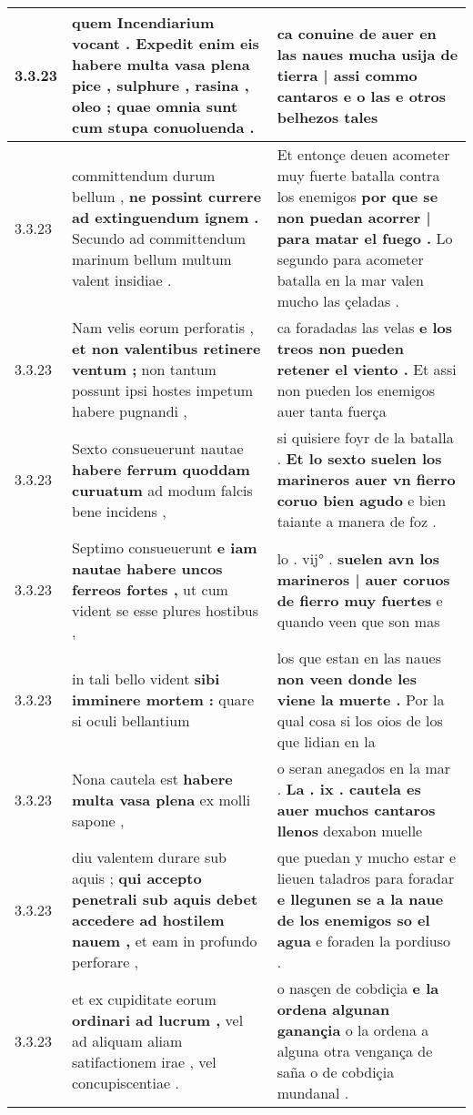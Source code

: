 \begin{tabular}{|p{1cm}|p{6.5cm}|p{6.5cm}|}
3.3.23 & quem Incendiarium vocant . \textbf{ Expedit enim eis habere multa vasa plena pice , sulphure , rasina , oleo ; } quae omnia sunt cum stupa conuoluenda . & ca conuine de auer en las naues \textbf{ mucha usija de tierra | assi commo cantaros e o las } e otros belhezos tales \\\hline
3.3.23 & committendum durum bellum , \textbf{ ne possint currere ad extinguendum ignem . } Secundo ad committendum marinum bellum multum valent insidiae . & Et entonçe deuen acometer muy fuerte batalla contra los enemigos \textbf{ por que se non puedan acorrer | para matar el fuego . } Lo segundo para acometer batalla en la mar valen mucho las çeladas . \\\hline
3.3.23 & Nam velis eorum perforatis , \textbf{ et non valentibus retinere ventum ; } non tantum possunt ipsi hostes impetum habere pugnandi , & ca foradadas las velas \textbf{ e los treos non pueden retener el viento . } Et assi non pueden los enemigos auer tanta fuerça \\\hline
3.3.23 & Sexto consueuerunt nautae \textbf{ habere ferrum quoddam curuatum } ad modum falcis bene incidens , & si quisiere foyr de la batalla . \textbf{ Et lo sexto suelen los marineros auer vn fierro coruo bien agudo } e bien taiante a manera de foz . \\\hline
3.3.23 & Septimo consueuerunt \textbf{ e iam nautae habere uncos ferreos fortes , } ut cum vident se esse plures hostibus , & lo . vij° . \textbf{ suelen avn los marineros | auer coruos de fierro muy fuertes } e quando veen que son mas \\\hline
3.3.23 & in tali bello vident \textbf{ sibi imminere mortem : } quare si oculi bellantium & los que estan en las naues \textbf{ non veen donde les viene la muerte . } Por la qual cosa si los oios de los que lidian en la \\\hline
3.3.23 & Nona cautela est \textbf{ habere multa vasa plena } ex molli sapone , & o seran anegados en la mar . \textbf{ La . ix . cautela es auer muchos cantaros llenos } dexabon muelle \\\hline
3.3.23 & diu valentem durare sub aquis ; \textbf{ qui accepto penetrali sub aquis debet accedere ad hostilem nauem , } et eam in profundo perforare , & que puedan y mucho estar e lieuen taladros para foradar \textbf{ e llegunen se a la naue de los enemigos so el agua } e foraden la pordiuso . \\\hline
3.3.23 & et ex cupiditate eorum \textbf{ ordinari ad lucrum , } vel ad aliquam aliam satifactionem irae , vel concupiscentiae . & o nasçen de cobdiçia \textbf{ e la ordena algunan ganançia } o la ordena a alguna otra vengança de saña o de cobdiçia mundanal . \\\hline

\end{tabular}
